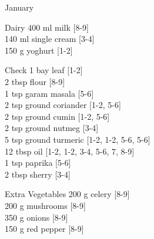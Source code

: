 \begin{menu}{January}
\begin{shoppinglist}{Dairy}
      400 ml milk 
        {\scriptsize[8-9]}\\
      140 ml single cream 
        {\scriptsize[3-4]}\\
      150 g yoghurt 
        {\scriptsize[1-2]}\\
      \end{shoppinglist}%
      \par\vfil %
      \vfil\clearpage %
      \begin{shoppinglist}{Check}
      1  bay leaf 
        {\scriptsize[1-2]}\\
      2 tbsp flour 
        {\scriptsize[8-9]}\\
      1 tsp garam masala 
        {\scriptsize[5-6]}\\
      2 tsp ground coriander 
        {\scriptsize[1-2, 5-6]}\\
      2 tsp ground cumin 
        {\scriptsize[1-2, 5-6]}\\
      2 tsp ground nutmeg 
        {\scriptsize[3-4]}\\
      5 tsp ground turmeric 
        {\scriptsize[1-2, 1-2, 5-6, 5-6]}\\
      12 tbsp oil 
        {\scriptsize[1-2, 1-2, 3-4, 5-6, 7, 8-9]}\\
      1 tsp paprika 
        {\scriptsize[5-6]}\\
      2 tbsp sherry 
        {\scriptsize[3-4]}\\
      \end{shoppinglist}%
      \begin{shoppinglist}{Extra Vegetables}
      200 g celery 
        {\scriptsize[8-9]}\\
      200 g mushrooms 
        {\scriptsize[8-9]}\\
      350 g onions 
        {\scriptsize[8-9]}\\
      150 g red pepper 
        {\scriptsize[8-9]}\\
      \end{shoppinglist}%
      \par\vfil %
    \vfil\clearpage
  

\end{menu}
